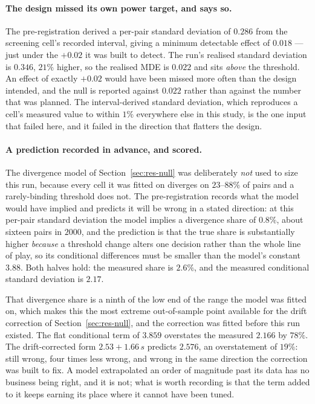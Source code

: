 \documentclass[11pt,letterpaper]{article}
\begin{document}
\paragraph{The design missed its own power target, and says so.} The
pre-registration derived a per-pair standard deviation of $0.286$ from the
screening cell's recorded interval, giving a minimum detectable effect of
$0.018$ --- just under the $+0.02$ it was built to detect. The run's realised
standard deviation is $0.346$, $21\%$ higher, so the realised MDE is $0.022$ and
sits \emph{above} the threshold. An effect of exactly $+0.02$ would have been
missed more often than the design intended, and the null is reported against
$0.022$ rather than against the number that was planned. The interval-derived
standard deviation, which reproduces a cell's measured value to within $1\%$
everywhere else in this study, is the one input that failed here, and it failed
in the direction that flatters the design.

\paragraph{A prediction recorded in advance, and scored.} The divergence model
of Section~\ref{sec:res-null} was deliberately \emph{not} used to size this run,
because every cell it was fitted on diverges on $23$--$88\%$ of pairs and a
rarely-binding threshold does not. The pre-registration records what the model
would have implied and predicts it will be wrong in a stated direction: at this
per-pair standard deviation the model implies a divergence share of $0.8\%$,
about sixteen pairs in $2000$, and the prediction is that the true share is
substantially higher \emph{because} a threshold change alters one decision
rather than the whole line of play, so its conditional differences must be
smaller than the model's constant $3.88$. Both halves hold: the measured share
is $2.6\%$, and the measured conditional standard deviation is $2.17$.

That divergence share is a ninth of the low end of the range the model was
fitted on, which makes this the most extreme out-of-sample point available for
the drift correction of Section~\ref{sec:res-null}, and the correction was
fitted before this run existed. The flat conditional term of $3.859$ overstates
the measured $2.166$ by $78\%$. The drift-corrected form
$2.53 + 1.66\,s$ predicts $2.576$, an overstatement of $19\%$: still wrong, four
times less wrong, and wrong in the same direction the correction was built to
fix. A model extrapolated an order of magnitude past its data has no business
being right, and it is not; what is worth recording is that the term added to it
keeps earning its place where it cannot have been tuned.
\end{document}
